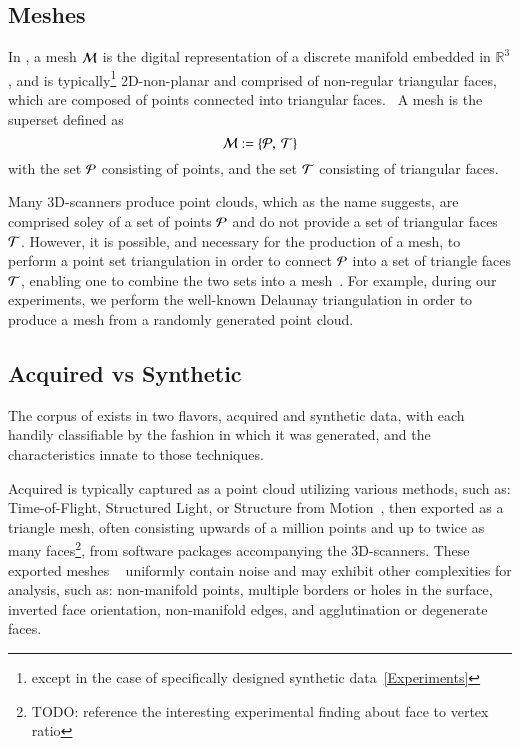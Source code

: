 \subsection{Meshes}
\label{ch2s3ssM}
In \tdd{}, a mesh $\mathcal{M}$ is the digital representation of a discrete manifold embedded in $\mathbb{R}^3$, and is typically\footnote{except in the case of specifically designed synthetic data~\ref{Experiments}} 2D-non-planar and comprised of non-regular triangular faces, which are composed of points connected into triangular faces.~\cite[p.~25]{Mara12} A mesh is the superset defined as
\begin{equation}
	\mathcal{M} := \left \{\mathcal{P},\:\mathcal{T}\right \}
	\label{eq:defineMesh}
\end{equation}%
%
with the set $\mathcal{P}$ consisting of points, and the set $\mathcal{T}$ consisting of triangular faces.

Many 3D-scanners produce point clouds\todoCitation{}{}, which as the name suggests, are comprised soley of a set of points $\mathcal{P}$ and do not provide a set of triangular faces $\mathcal{T}$. However, it is possible, and necessary for the production of a mesh, to perform a point set triangulation\todoCitation{}{} in order to connect $\mathcal{P}$ into a set of triangle faces $\mathcal{T}$, enabling one to combine the two sets into a mesh~\cite[p.~26]{Mara12}. For example, during our experiments, we perform the well-known Delaunay triangulation\todoCitation{} in order to produce a mesh from a randomly generated point cloud.
%
\subsection{Acquired vs Synthetic \tdd{}}
\label{ch2s3ssAVS3}
The corpus of \tdd{} exists in two flavors, acquired and synthetic data, with each handily classifiable by the fashion in which it was generated, and the characteristics innate to those techniques.

Acquired \tdd{} is typically captured as a point cloud utilizing various methods, such as: Time-of-Flight, Structured Light, or Structure from Motion~\cite[p.~19]{Mara12}, then exported as a triangle mesh, often consisting upwards of a million points and up to twice as many faces\footnote{TODO: reference the interesting experimental finding about face to vertex ratio}, from software packages accompanying the 3D-scanners. These exported meshes ~\cite[p.~25]{Mara12} uniformly contain noise and may exhibit other complexities for analysis, such as: non-manifold points, multiple borders or holes in the surface, inverted face orientation, non-manifold edges, and agglutination or degenerate faces. ~\cite[p.~28-32]{Mara12}

